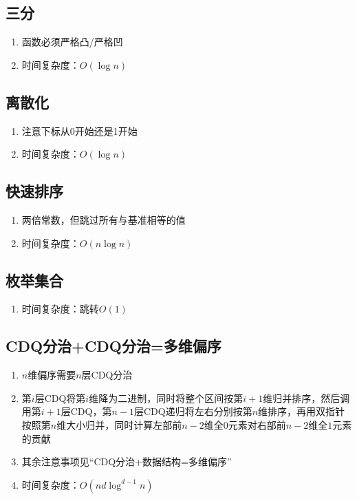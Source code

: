 \documentclass[twocolumn,a4,8pt]{article}  %
\begin{document}
	 	\subsection{三分}
			\noindent\begin{enumerate}
				\item 函数必须严格凸/严格凹
				\item 时间复杂度：$O(\log n)$
			\end{enumerate}
	 	 	
	 	 	
	 	\subsection{离散化}
			\noindent\begin{enumerate}
				\item 注意下标从0开始还是1开始
				\item 时间复杂度：$O(\log n)$
			\end{enumerate}
	 	 	
	 	 	
	 	\subsection{快速排序}
			\noindent\begin{enumerate}
				\item 两倍常数，但跳过所有与基准相等的值
				\item 时间复杂度：$O(n\log n)$
			\end{enumerate}
	 	 	
	 	 	
 	 	\subsection{枚举集合}
			\noindent\begin{enumerate}
				\item 时间复杂度：跳转$O(1)$
			\end{enumerate}
	 	 	
	 	 	
	 	\subsection{CDQ分治+CDQ分治=多维偏序}
			\noindent\begin{enumerate}
				\item $n$维偏序需要$n$层CDQ分治
				\item 第$i$层CDQ将第$i$维降为二进制，同时将整个区间按第$i+1$维归并排序，然后调用第$i+1$层CDQ，第$n-1$层CDQ递归将左右分别按第$n$维排序，再用双指针按照第$n$维大小归并，同时计算左部前$n-2$维全$0$元素对右部前$n-2$维全$1$元素的贡献
				\item 其余注意事项见“CDQ分治+数据结构=多维偏序”
				\item 时间复杂度：$O(nd\log^{d-1}n)$
			\end{enumerate}
	 	 	
\end{document}
